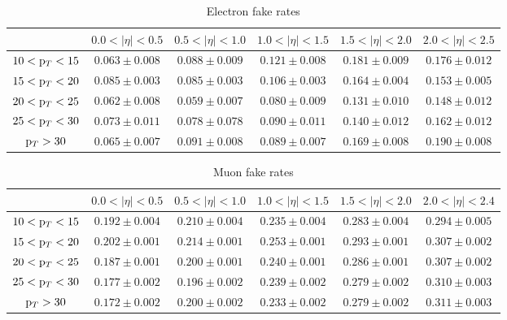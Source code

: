 \begin{table}[!ht]
\centering
\scalebox{0.9}
{
\begin{tabular}{|c|c|c|c|c|c|}
\hline
                & $0.0 < |\eta| < 0.5$ & $0.5 < |\eta| < 1.0$ & $1.0 < |\eta| < 1.5$ & $1.5 < |\eta| < 2
.0$ & $2.0 < |\eta| < 2.5$ \\
\hline
$10 < {\mathrm p_{T}} < 15$ &  $0.063 \pm  0.008$  & $ 0.088 \pm  0.009$  &  $0.121 \pm  0.008$  &  $0.181 \pm  0.00
9$  &  $0.176 \pm  0.012$ \\
\hline  
$15 < {\mathrm p_{T}} < 20$ &  $0.085 \pm  0.003$  & $ 0.085 \pm  0.003$  &  $0.106 \pm  0.003$  &  $0.164 \pm  0.00
4$  &  $0.153 \pm  0.005$ \\
\hline
$20 < {\mathrm p_{T}} < 25$ & $ 0.062 \pm  0.008$  &  $0.059 \pm  0.007$  &  $0.080 \pm  0.009$  &  $0.131 \pm  0.010$  &  $0.148 \pm  0.012$ \\
\hline 
$25 < {\mathrm p_{T}} < 30$ &  $0.073 \pm  0.011$  &  $0.078 \pm  0.078$  &  $0.090 \pm  0.011$  &  $0.140 \pm  0.012$  &  $0.162 \pm  0.012$ \\
\hline
${\mathrm p_{T}} > 30$      &  $0.065 \pm  0.007$  &  $0.091 \pm  0.008$  &  $0.089 \pm  0.007$  &  $0.169 \pm  0.008$  &  $0.190 \pm  0.008$ \\
\hline    
\end{tabular}   
}
\caption{Electron fake rates}
\label{tab:ele_fr}
\end{table}

\begin{table}[!ht]
\centering
\scalebox{0.9}
{
\begin{tabular}{|c|c|c|c|c|c|}
\hline
                & $0.0 < |\eta| < 0.5$ & $0.5 < |\eta| < 1.0$ & $1.0 < |\eta| < 1.5$ & $1.5 < |\eta| < 2.0$ & $2.0 < |\eta| < 2.4$ \\
\hline
$10 < {\mathrm p_{T}} < 15$ &  $0.192 \pm  0.004$  & $ 0.210 \pm  0.004$  &  $0.235 \pm  0.004$  &  $0.283 \pm  0.004$  &  $0.294 \pm  0.005$ \\
\hline
$15 < {\mathrm p_{T}} < 20$ &  $0.202 \pm  0.001$  & $ 0.214 \pm  0.001$  &  $0.253 \pm  0.001$  &  $0.293 \pm  0.001$  &  $0.307 \pm  0.002$ \\
\hline
$20 < {\mathrm p_{T}} < 25$ & $ 0.187 \pm  0.001$  &  $0.200 \pm  0.001$  &  $0.240 \pm  0.001$  &  $0.286 \pm  0.001$  &  $0.307 \pm  0.002$ \\
\hline 
$25 < {\mathrm p_{T}} < 30$ &  $0.177 \pm  0.002$  &  $0.196 \pm  0.002$  &  $0.239 \pm  0.002$  &  $0.279 \pm  0.002$  &  $0.310 \pm  0.003$ \\
\hline
${\mathrm p_{T}} > 30$      &  $0.172 \pm  0.002$  &  $0.200 \pm  0.002$  &  $0.233 \pm  0.002$  &  $0.279 \pm  0.002$  &  $0.311 \pm  0.003$ \\
\hline    
\end{tabular}   
}
\caption{Muon fake rates}
\label{tab:muon_fr}
\end{table}

